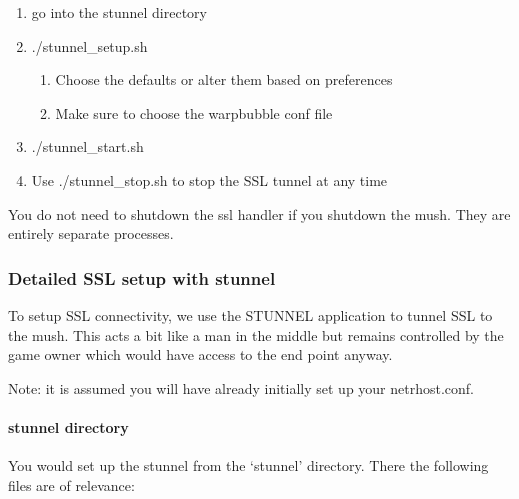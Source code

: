 \documentclass[letterpaper,10pt,english]{sphinxmanual}
\begin{document}
\begin{enumerate}
\begin{enumerate}
\begin{enumerate}
\end{enumerate}

\end{enumerate}

\item {} 
\sphinxAtStartPar
go into the stunnel directory

\item {} 
\sphinxAtStartPar
./stunnel\_setup.sh
\begin{enumerate}
%
\item {} 
\sphinxAtStartPar
Choose the defaults or alter them based on preferences

\item {} 
\sphinxAtStartPar
Make sure to choose the warpbubble conf file

\end{enumerate}

\item {} 
\sphinxAtStartPar
./stunnel\_start.sh

\item {} 
\sphinxAtStartPar
Use ./stunnel\_stop.sh to stop the SSL tunnel at any time

\end{enumerate}

\sphinxAtStartPar
You do not need to shutdown the ssl handler if you shutdown the mush.  They
are entirely separate processes.


\subsubsection{Detailed SSL setup with stunnel}
\label{\detokenize{security:detailed-ssl-setup-with-stunnel}}
\sphinxAtStartPar
To setup SSL connectivity, we use the STUNNEL application to tunnel SSL to
the mush.  This acts a bit like a man in the middle but remains controlled
by the game owner which would have access to the end point anyway.

\sphinxAtStartPar
Note: it is assumed you will have already initially set up your netrhost.conf.


\paragraph{stunnel directory}
\label{\detokenize{security:stunnel-directory}}
\sphinxAtStartPar
You would set up the stunnel from the ‘stunnel’ directory.  There the following
files are of relevance:
\end{document}
